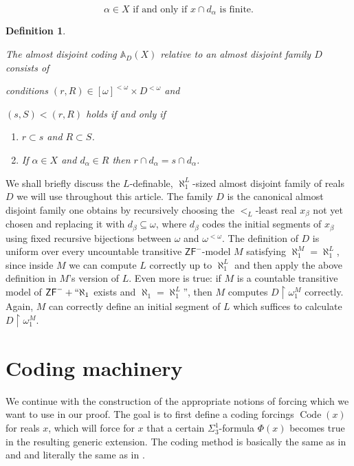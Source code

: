\documentclass[a4paper,11pt]{article}
\newtheorem{definition}[theorem]{Definition}
\newcommand{\ZFP}{\mathsf{ZF}^-}
\begin{document}
    $$\alpha \in X \text{ if and only if } x \cap d_{\alpha} \text{ is finite.}$$
    
    \begin{definition}\label{definitionadcoding}
    
     The almost disjoint coding $\mathbb{A}_D(X)$ relative to an almost disjoint family $D$ consists of
    
     conditions $(r, R) \in [\omega]^{<\omega} \times D^{<\omega}$ and
    
     $(s,S) < (r,R)$ holds if and only if
    
     \begin{enumerate}
    
      \item $r \subset s$ and $R \subset S$.
    
      \item If $\alpha \in X$ and $d_{\alpha} \in R$ then $r \cap d_{\alpha} = s \cap d_{\alpha}$.
    
     \end{enumerate}
    
    \end{definition}
We shall briefly discuss the $L$-definable, $\aleph_1^L$-sized almost disjoint family of reals $D$ we will use throughout this article. The family $D$ is the canonical almost disjoint family one obtains by recursively choosing the $<_L$-least real $x_\beta$ not yet chosen and replacing it with $d_\beta\subseteq\omega$, where $d_\beta$ codes the initial segments of $x_\beta$ using fixed recursive bijections between $\omega$ and $\omega^{<\omega}$. The definition of $D$ is uniform over every uncountable transitive $\ZFP$-model $M$ satisfying $\aleph_1^M=\aleph_1^L$, since inside $M$ we can compute $L$ correctly up to $\aleph_1^L$ and then apply the above definition in $M$'s version of $L$. Even more is true: if $M$ is a countable transitive model of $\ZFP+``\aleph_1$ exists and $\aleph_1=\aleph_1^L$'', then $M$ computes $D\upharpoonright\omega_1^M$ correctly. Again, $M$ can correctly define an initial segment of $L$ which suffices to calculate $D\upharpoonright\omega_1^M$.
    
    
    \section{Coding machinery}
    
    We continue with the construction of the appropriate notions of forcing which we want to use in our proof. The goal is to first define a coding forcings $\operatorname{Code} (x)$ for reals $x$, which will force for $x$ that a certain $\Sigma^1_3$-formula $\Phi(x)$ becomes true in the resulting generic extension. The coding method is basically the same as in \cite{Reduction} and \cite{Uniformization} and literally the same as in \cite{Separation without reduction}.
   
\end{document}
